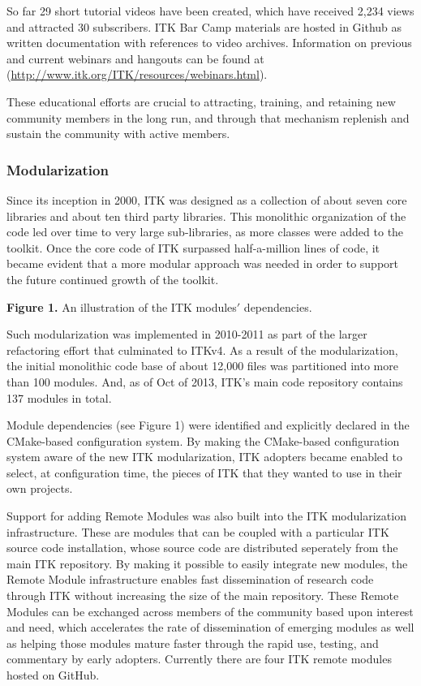\documentclass{frontiersENG} %
\begin{document}
So far 29 short tutorial videos have been created, which have received 2,234
views and attracted 30 subscribers. ITK Bar Camp materials are hosted in Github
as written documentation with references to video archives. Information on
previous and current webinars and hangouts can be found at
(\url{http://www.itk.org/ITK/resources/webinars.html}).

These educational efforts are crucial to attracting, training, and retaining
new community members in the long run, and through that mechanism replenish
and sustain the community with active members.

\subsubsection{Modularization}

Since its inception in 2000, ITK was designed as a collection of about seven
core libraries and about ten third party libraries.  This monolithic
organization of the code led over time to very large sub-libraries, as more
classes were added to the toolkit. Once the core code of ITK surpassed
half-a-million lines of code, it became evident that a more modular approach
was needed in order to support the future continued growth of the toolkit.

\textbf{Figure 1. }{An illustration of the ITK modules$'$ dependencies.}\label{fig:01}

Such modularization was implemented in 2010-2011 as part of the larger
refactoring effort that culminated to ITKv4.  As a result of the modularization, the
initial monolithic code base of about 12,000 files was partitioned into more
than 100 modules.  And, as of Oct of 2013, ITK's main code repository contains
137 modules in total.

Module dependencies (see Figure 1) were identified and explicitly declared in
the CMake-based \cite{CMake} configuration system. By making the CMake-based
configuration system aware of the new ITK modularization, ITK adopters became
enabled to select, at configuration time, the pieces of ITK that they wanted to
use in their own projects.

Support for adding Remote Modules was also built into the ITK modularization
infrastructure. These are modules that can be coupled with a particular
ITK source code installation, whose source code are distributed seperately from
the main ITK repository. By making it possible to easily integrate
new modules, the Remote Module infrastructure enables fast
dissemination of research code through ITK without increasing the size of the
main repository. These Remote Modules can be exchanged across members of the
community based upon interest and need, which accelerates the rate
of dissemination of emerging modules as well as helping those modules mature
faster through the rapid use, testing, and commentary by early adopters. Currently
there are four ITK remote modules hosted on GitHub.
\end{document}
